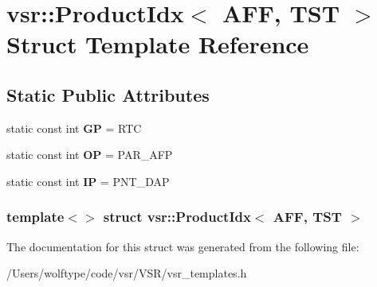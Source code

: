 \hypertarget{structvsr_1_1_product_idx_3_01_a_f_f_00_01_t_s_t_01_4}{\section{vsr\-:\-:Product\-Idx$<$ A\-F\-F, T\-S\-T $>$ Struct Template Reference}
\label{structvsr_1_1_product_idx_3_01_a_f_f_00_01_t_s_t_01_4}
}
\subsection*{Static Public Attributes}
\begin{DoxyCompactItemize}
\item 
\hypertarget{structvsr_1_1_product_idx_3_01_a_f_f_00_01_t_s_t_01_4_a8bb67f33c51f16169e1dc2ae60a2241b}{static const int {\bfseries G\-P} = R\-T\-C}\label{structvsr_1_1_product_idx_3_01_a_f_f_00_01_t_s_t_01_4_a8bb67f33c51f16169e1dc2ae60a2241b}

\item 
\hypertarget{structvsr_1_1_product_idx_3_01_a_f_f_00_01_t_s_t_01_4_a80a06970388a76ca2fd8e0f10652ff82}{static const int {\bfseries O\-P} = P\-A\-R\-\_\-\-A\-F\-P}\label{structvsr_1_1_product_idx_3_01_a_f_f_00_01_t_s_t_01_4_a80a06970388a76ca2fd8e0f10652ff82}

\item 
\hypertarget{structvsr_1_1_product_idx_3_01_a_f_f_00_01_t_s_t_01_4_a60b1fe2f75429df52fa5853d64401d3a}{static const int {\bfseries I\-P} = P\-N\-T\-\_\-\-D\-A\-P}\label{structvsr_1_1_product_idx_3_01_a_f_f_00_01_t_s_t_01_4_a60b1fe2f75429df52fa5853d64401d3a}

\end{DoxyCompactItemize}
\subsubsection*{template$<$$>$ struct vsr\-::\-Product\-Idx$<$ A\-F\-F, T\-S\-T $>$}



The documentation for this struct was generated from the following file\-:\begin{DoxyCompactItemize}
\item 
/\-Users/wolftype/code/vsr/\-V\-S\-R/vsr\-\_\-templates.\-h\end{DoxyCompactItemize}
